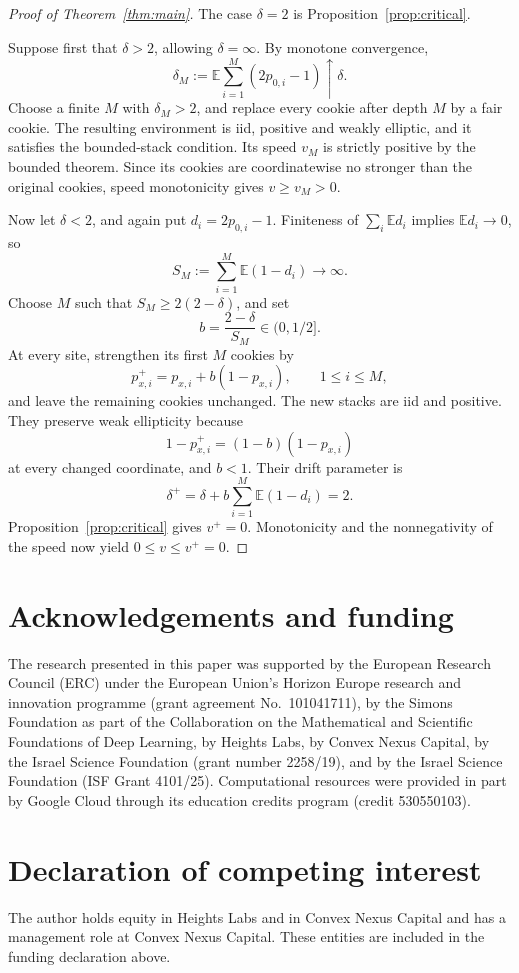 \documentclass[11pt]{amsart}
\numberwithin{equation}{section}
\theoremstyle{remark}
\newcommand{\E}{\mathbb E}
\begin{document}
\begin{proof}[Proof of Theorem~\ref{thm:main}]
The case $\delta=2$ is Proposition~\ref{prop:critical}.

Suppose first that $\delta>2$, allowing $\delta=\infty$. By monotone convergence,
\[
 \delta_M:=\E\sum_{i=1}^M(2p_{0,i}-1)\uparrow\delta.
\]
Choose a finite $M$ with $\delta_M>2$, and replace every cookie after depth $M$ by a fair cookie. The resulting environment is iid, positive and weakly elliptic, and it satisfies the bounded-stack condition. Its speed $v_M$ is strictly positive by the bounded theorem. Since its cookies are coordinatewise no stronger than the original cookies, speed monotonicity gives $v\ge v_M>0$.

Now let $\delta<2$, and again put $d_i=2p_{0,i}-1$. Finiteness of $\sum_i\E d_i$ implies $\E d_i\to0$, so
\[
 S_M:=\sum_{i=1}^M\E(1-d_i)\longrightarrow\infty.
\]
Choose $M$ such that $S_M\ge2(2-\delta)$, and set
\[
 b=\frac{2-\delta}{S_M}\in(0,1/2].
\]
At every site, strengthen its first $M$ cookies by
\begin{equation}\label{eq:strengthen}
 p_{x,i}^+=p_{x,i}+b(1-p_{x,i}),\qquad 1\le i\le M,
\end{equation}
and leave the remaining cookies unchanged. The new stacks are iid and positive. They preserve weak ellipticity because
\[
 1-p_{x,i}^+=(1-b)(1-p_{x,i})
\]
at every changed coordinate, and $b<1$. Their drift parameter is
\[
 \delta^+=\delta+b\sum_{i=1}^M\E(1-d_i)=2.
\]
Proposition~\ref{prop:critical} gives $v^+=0$. Monotonicity and the nonnegativity of the speed now yield $0\le v\le v^+=0$.
\end{proof}

\section*{Acknowledgements and funding}
The research presented in this paper was supported by the European Research Council (ERC) under the European Union's Horizon Europe research and innovation programme (grant agreement No.~101041711), by the Simons Foundation as part of the Collaboration on the Mathematical and Scientific Foundations of Deep Learning, by Heights Labs, by Convex Nexus Capital, by the Israel Science Foundation (grant number 2258/19), and by the Israel Science Foundation (ISF Grant 4101/25). Computational resources were provided in part by Google Cloud through its education credits program (credit 530550103).

\section*{Declaration of competing interest}
The author holds equity in Heights Labs and in Convex Nexus Capital and has a management role at Convex Nexus Capital. These entities are included in the funding declaration above.
\end{document}
